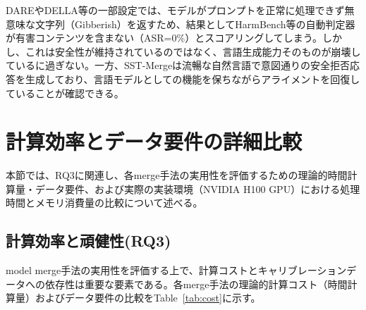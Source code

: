 \documentclass{article}
\begin{document}
DAREやDELLA等の一部設定では、モデルがプロンプトを正常に処理できず無意味な文字列（Gibberish）を返すため、結果としてHarmBench等の自動判定器が有害コンテンツを含まない（ASR=0\%）とスコアリングしてしまう。しかし、これは安全性が維持されているのではなく、言語生成能力そのものが崩壊しているに過ぎない。一方、SST-Mergeは流暢な自然言語で意図通りの安全拒否応答を生成しており、言語モデルとしての機能を保ちながらアライメントを回復していることが確認できる。



\section{計算効率とデータ要件の詳細比較}
\label{app:efficiency}
本節では、RQ3に関連し、各merge手法の実用性を評価するための理論的時間計算量・データ要件、および実際の実装環境（NVIDIA H100 GPU）における処理時間とメモリ消費量の比較について述べる。

\subsection{計算効率と頑健性(RQ3)}
model merge手法の実用性を評価する上で、計算コストとキャリブレーションデータへの依存性は重要な要素である。各merge手法の理論的計算コスト（時間計算量）およびデータ要件の比較をTable~\ref{tab:cost}に示す。
\end{document}
